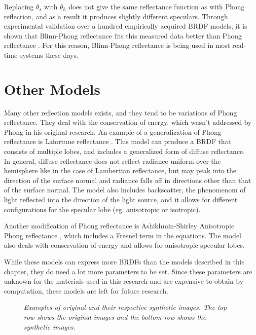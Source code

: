 Replacing $\theta_s$ with $\theta_h$ does not give the same reflectance function as with Phong reflection, and as a result it produces slightly different speculars. Through experimental validation over a hundred empirically acquired BRDF models, it is shown that Blinn-Phong reflectance fits this measured data better than Phong reflectance \cite{ExperimentalValidation}. For this reason, Blinn-Phong reflectance is being used in most real-time systems these days.

	\section{Other Models}\label{sec:Other}
		Many other reflection models exists, and they tend to be variations of Phong reflectance. They deal with the conservation of energy, which wasn't addressed by Phong in his original research. An example of a generalization of Phong reflectance is Lafortune reflectance \cite{Lafortune}. This model can produce a BRDF that consists of multiple lobes, and includes a generalized form of diffuse reflectance. In general, diffuse reflectance does not reflect radiance uniform over the hemisphere like in the case of Lambertian reflectance, but may peak into the direction of the surface normal and radiance falls off in directions other than that of the surface normal. The model also includes backscatter, the phenomenom of light reflected into the direction of the light source, and it allows for different configurations for the specular lobe (eg. anisotropic or isotropic).

Another modification of Phong reflectance is Ashikhmin-Shirley Anisotropic Phong reflectance \cite{AshikhminShirley}, which includes a Fresnel term in the equations. The model also deals with conservation of energy and allows for anisotropic specular lobes.

While these models can express more BRDFs than the models described in this chapter, they do need a lot more parameters to be set. Since these parameters are unknown for the materials used in this research and are expensive to obtain by computation, these models are left for future research.

\begin{figure}[htbp!]
	\begin{center}

	\end{center}
	\caption{{\it Examples of original and their respective synthetic images. The top row shows the original images and the bottom row shows the synthetic images.}}
	\label{fig:RenderExamples1}
\end{figure}

